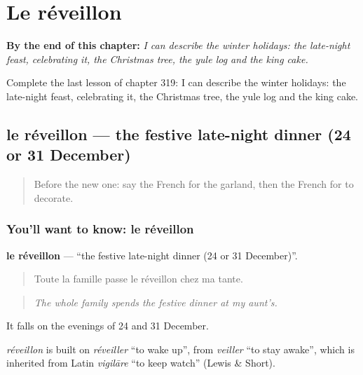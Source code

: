
\chapter{Le réveillon}
\label{ch:fr-le-reveillon}

\begin{chapteropening}
\textbf{By the end of this chapter:} \emph{I can describe the winter holidays: the late-night feast, celebrating it, the Christmas tree, the yule log and the king cake.}

Complete the last lesson of chapter 319: I can describe the winter holidays: the late-night feast, celebrating it, the Christmas tree, the yule log and the king cake.
\end{chapteropening}

\section[le réveillon]{le réveillon — the festive late-night dinner (24 or 31 December)}

\label{lesson:FR-C319-reveillon}



\begin{quote}
Before the new one: say the French for the garland, then the French for to decorate.
\end{quote}

\subsection*{You'll want to know: le réveillon}
\textbf{le réveillon} — \textquotedblleft{}the festive late-night dinner (24 or 31 December)\textquotedblright{}.

\begin{quote}
Toute la famille passe le réveillon chez ma tante.
\end{quote}

\begin{quote}
\emph{The whole family spends the festive dinner at my aunt's.}
\end{quote}

It falls on the evenings of 24 and 31 December.

\begin{cousinweb}
\emph{réveillon} is built on \emph{réveiller} \textquotedblleft{}to wake up\textquotedblright{}, from \emph{veiller} \textquotedblleft{}to stay awake\textquotedblright{}, which is inherited from Latin \emph{vigilāre} \textquotedblleft{}to keep watch\textquotedblright{} (Lewis \& Short).
\end{cousinweb}

